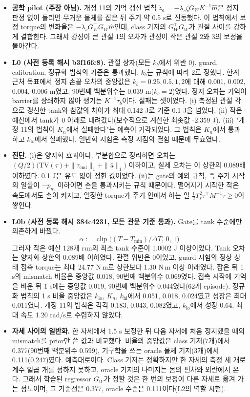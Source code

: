 \documentclass[11pt]{article}\usepackage[margin=1in]{geometry}\usepackage{amsmath,amssymb,amsthm,mathtools}\usepackage{graphicx}\graphicspath{{figures/}{../figures/}{figs/}{./}}\usepackage{enumitem}\usepackage{hyperref}\usepackage{cleveref}\usepackage{tikz}\usetikzlibrary{arrows.meta,positioning,calc,shapes.geometric}\usepackage{float}\usepackage{rotating}\usepackage[most]{tcolorbox}\usepackage{kotex}\usepackage{booktabs}\usepackage{longtable}\emergencystretch=1.6em\tolerance=2000 \crefname{assumption}{Assumption}{Assumptions}\Crefname{assumption}{Assumption}{Assumptions}\crefname{definition}{Definition}{Definitions}\Crefname{definition}{Definition}{Definitions}\crefname{proposition}{Proposition}{Propositions}\Crefname{proposition}{Proposition}{Propositions}\crefname{fact}{Fact}{Facts}\Crefname{fact}{Fact}{Facts} \newtheorem{assumption}{Assumption}\newtheorem{definition}{Definition}\newtheorem{lemma}{Lemma}\newtheorem{proposition}{Proposition}\newtheorem{theorem}{Theorem}\newtheorem{corollary}{Corollary}\newtheorem{fact}{Fact}\theoremstyle{remark}\newtheorem{remark}{Remark} \newcommand{\R}{\mathbb{R}}\newcommand{\xb}{\bar x}\newcommand{\Ab}{\bar A}\newcommand{\By}{\bar B_y}\newcommand{\U}{\mathcal U}\newcommand{\Z}{\mathcal Z}
\begin{document}
\begin{itemize}
\item \textbf{공학 pilot (주장 아님).} 개정 11의 기억 갱신 법칙 $\dot z_a=-\lambda_s\zeta G_WK^{-1}\hat m$은 정지 판정 없이 돌리면 무거운 물체를 잡은 뒤 주기 약 0.5 s로 진동했다. 이 법칙에서 보정 torque의 변화율은 $-\lambda_sG_W^\top G_W\hat m$인데, class 기저의 $G_W^\top G_W$가 관절 사이를 강하게 결합한다. 그래서 강성이 큰 관절 1의 오차가 관성이 작은 관절 2와 3의 보정을 몰아간다.
\item \textbf{L0 (사전 등록 해시 b3f16fc8).} 관절 상자(모든 $k_b$에서 위반 0), guard, calibration, 정규화 법칙의 기준은 통과했다. $k_b$는 규칙에 따라 2로 정했다. 한계 근처 목표에서 정지 손끝 오차의 중앙값은 $k_b=0.25,0.5,1,2$에 대해 0.001, 0.002, 0.004, 0.006 m였고, 90번째 백분위수는 0.039 m($k_b=2$)였다. 정지 오차는 기억이 barrier를 상쇄하지 않아 생기는 $K^{-1}\tau_b$이다. 실패는 셋이었다. (i) 측정된 관절 각으로 갱신한 tank와 참값의 차이가 최대 0.142 J로 기준 0.1 J을 넘었다. (ii) 작은 예산에서 tank가 0 아래로 내려갔다(보수적으로 계산한 최솟값 -2.359 J). (iii) "개정 11의 법칙이 $K_n$에서 실패한다"는 예측이 기각되었다. 그 법칙은 $K_n$에서 통과하고 $k_{\mathrm{lo}}$에서 실패했다. 일반화 시험은 측정 시점의 결함 때문에 무효였다.
\item \textbf{진단.} (i)은 양자화 효과이다. 부분합으로 정리하면 오차는 $(Q/2)\big(\mathrm{TV}(\tau)+\|\tau_{\mathrm{end}}\|_1+\|\bar u\|_1\big)$ 이하이고, 실제 오차는 이 상한의 0.089배 이하였다. 0.1 J은 유도 없이 정한 값이었다. (ii)는 gate의 예외 규칙, 즉 주기 시작의 일률이 $-p_m$ 이하이면 손을 통과시키는 규칙 때문이다. 떨어지기 시작한 작은 속도에서도 손이 켜지고, 일정한 torque가 주기 안에서 하는 일 $\tfrac12T_s^2\tau^\top M^{-1}\tau\ge0$이 쌓인다.
\item \textbf{L0b (사전 등록 해시 384c4231, 모든 관문 기준 통과).} Gate를 tank 수준에만 의존하게 바꿨다.
\[
\alpha:=\operatorname{clip}\big((T-T_{\min})/\Delta T,\,0,\,1\big)
\]
그러자 작은 예산 128개 run의 최소 tank 수준이 1.0002 J 이상이었다. Tank 오차는 양자화 상한의 0.089배 이하였다. 관절 위반은 0이었고, guard 시험의 정상 상태 접촉 torque는 최대 24.77 N\,m로 상한보다 1.30 N\,m 이상 아래였다. 잡은 뒤 1 s의 mismatch 비율은 중앙값 0.018, 90번째 백분위수 0.069였다. 접촉 시작에 기억을 비운 뒤 1 s에는 중앙값 0.019, 90번째 백분위수 0.044였다(62개 episode). 정규화 법칙의 1 s 비율 중앙값은 $k_{\mathrm{lo}}$, $K_n$, $k_{\mathrm{hi}}$에서 0.051, 0.018, 0.024였고 성장은 최대 0.011였다. 개정 11의 법칙은 각각 0.183, 0.043, 0.082였고, $k_{\mathrm{lo}}$에서 성장 0.64, 최대 속도 1.20 rad/s로 수렴하지 않았다.
\item \textbf{자세 사이의 일반화.} 한 자세에서 1.5 s 보정한 뒤 다음 자세에 처음 정지했을 때의 mismatch를 prior만 쓴 값과 비교했다. 비율의 중앙값은 class 기저(7개)에서 0.377(90번째 백분위수 0.599), 기구학을 쓰는 oracle 물체 기저(3개)에서 0.111(0.247)였다. 예측대로이다. Class 기저는 정확하지만 한 자세의 측정 세 개로 계수 일곱 개를 정하지 못하고, oracle 기저의 나머지는 몸의 편차와 외란에서 온다. 그래서 학습된 regressor $G_W$가 정할 것은 한 번의 보정이 다른 자세로 옮겨 가는 정도이며, 그 기준선은 0.377, oracle 수준은 0.111이다(L2의 역할 시험).

\end{itemize}
\end{document}
